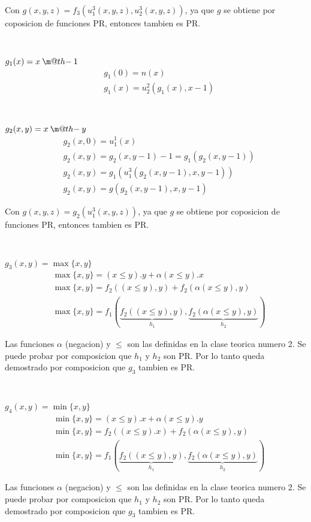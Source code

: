 \documentclass{report}
\makeatletter
\newcommand{\dotminus}{\mathbin{\text{\@dotminus}}}
\newcommand{\@dotminus}{%
  \ooalign{\hidewidth\raise1ex\hbox{.}\hidewidth\cr$\m@th-$\cr}%
}
\makeatother
\begin{document}
Con $g(x,y,z) = f_3(u_1^3(x,y,z),u_2^3(x,y,z))$, ya que $g$ se obtiene por coposicion de funciones PR, entonces tambien es PR.

~

\sol
$g_1(x)=x \dotminus 1$
\begin{align*}
	&g_{1}(0)=n(x)\\&g_{1}(x)=u_{2}^{2}(g_{1}(x),x-1)
\end{align*}

~

\sol
$g_2(x,y)=x \dotminus y$
\begin{align*}
	&g_{2}(x,0)=u_{1}^{1}(x)\\
	&g_{2}(x,y)=g_{2}(x,y-1)-1=g_{1}(g_{2}(x,y-1))\\
	&g_{2}(x,y)=g_{1}(u_{1}^{3}(g_{2}(x,y-1),x,y-1))\\
	&g_{2}(x,y)=g(g_{2}(x,y-1),x,y-1)
\end{align*}

Con $g(x,y,z) = g_2(u_1^3(x,y,z))$, ya que $g$ se obtiene por coposicion de funciones PR, entonces tambien es PR.

~

\sol
$g_3(x,y)=\max\{x,y\}$
\begin{align*}
	&\max\{x,y\}=(x\leqslant y).y+\alpha(x\leqslant y).x\\
	&\max\{x,y\}=f_{2}((x\leqslant y),y)+f_{2}(\alpha(x\leqslant y),y)\\
	&\max\{x,y\}=f_{1}(\underbrace{f_{2}((x\leqslant y),y)}_{h_{1}},\underbrace{f_{2}(\alpha(x\leqslant y),y)}_{h_{2}})
\end{align*}

Las funciones $\alpha$ (negacion) y $\leq$ son las definidas en la clase teorica numero 2.
Se puede probar por composicion que $h_1$ y $h_2$ son PR. Por lo tanto queda demostrado por composicion que $g_3$ tambien es PR.

~

\sol
$g_4(x,y)=\min\{x,y\}$
\begin{align*}
	&\min\{x,y\}=(x\leqslant y).x+\alpha(x\leqslant y).y\\
	&\min\{x,y\}=f_{2}((x\leqslant y).x)+f_{2}(\alpha(x\leqslant y),y)\\
	&\min\{x,y\}=f_{1}(\underbrace{f_{2}((x\leqslant y),y)}_{h_{1}},\underbrace{f_{2}(\alpha(x\leqslant y),y)}_{h_{2}})
\end{align*}

Las funciones $\alpha$ (negacion) y $\leq$ son las definidas en la clase teorica numero 2.
Se puede probar por composicion que $h_1$ y $h_2$ son PR. Por lo tanto queda demostrado por composicion que $g_3$ tambien es PR.
\end{document}
